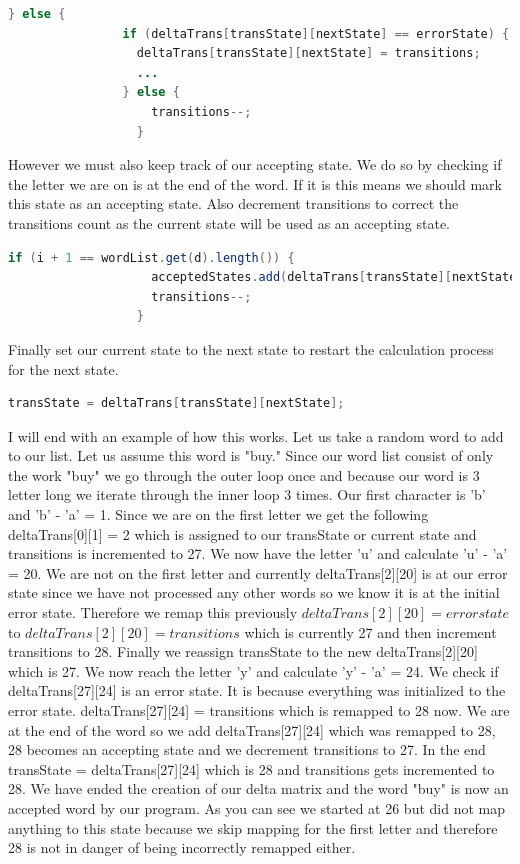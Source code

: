 \documentclass[letter, 12pt]{article}
\begin{document}
\begin{lstlisting}[language=Java]
            } else {
                if (deltaTrans[transState][nextState] == errorState) {
                  deltaTrans[transState][nextState] = transitions;
                  ...
                } else {
                    transitions--;
                  }
\end{lstlisting}
However we must also keep track of our accepting state. We do so by checking if the letter we are on is at the end of the word. If it is this means we should mark this state as an accepting state. Also decrement transitions to correct the transitions count as the current state will be used as an accepting state.
\begin{lstlisting}[language=Java]
                  if (i + 1 == wordList.get(d).length()) {
                    acceptedStates.add(deltaTrans[transState][nextState]);
                    transitions--;
                  }
\end{lstlisting}
Finally set our current state to the next state to restart the calculation process for the next state.
\begin{lstlisting}[language=Java]
                transState = deltaTrans[transState][nextState];
\end{lstlisting}

I will end with an example of how this works. Let us take a random word to add to our list. Let us assume this word is "buy." Since our word list consist of only the work "buy" we go through the outer loop once and because our word is 3 letter long we iterate through the inner loop 3 times. Our first character is 'b' and 'b' - 'a' = 1. Since we are on the first letter we get the following deltaTrans[0][1] = 2 which is assigned to our transState or current state and transitions is incremented to 27. We now have the letter 'u' and calculate 'u' - 'a' = 20. We are not on the first letter and currently deltaTrans[2][20] is at our error state since we have not processed any other words so we know it is at the initial error state. Therefore we remap this previously $deltaTrans[2][20] = error state$ to $deltaTrans[2][20] = transitions$ which is currently 27 and then increment transitions to 28. Finally we reassign transState to the new deltaTrans[2][20] which is 27. We now reach the letter 'y' and calculate 'y' - 'a' = 24. We check if deltaTrans[27][24] is an error state. It is because everything was initialized to the error state. deltaTrans[27][24] = transitions which is remapped to 28 now.  We are at the end of the word so we add deltaTrans[27][24] which was remapped to 28, 28 becomes an accepting state and we decrement transitions to 27. In the end transState = deltaTrans[27][24] which is 28 and transitions gets incremented to 28. We have ended the creation of our delta matrix and the word "buy" is now an accepted word by our program. As you can see we started at 26 but did not map anything to this state because we skip mapping for the first letter and therefore 28 is not in danger of being incorrectly remapped either.
\end{document}
